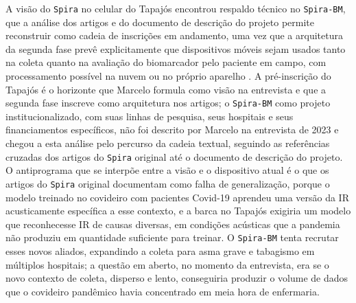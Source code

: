 A visão do \texttt{Spira} no celular do Tapajós encontrou respaldo técnico no \texttt{Spira-BM}, que a análise dos artigos e do documento de descrição do projeto permite reconstruir como cadeia de inscrições em andamento, uma vez que a arquitetura da segunda fase prevê explicitamente que dispositivos móveis sejam usados tanto na coleta quanto na avaliação do biomarcador pelo paciente em campo, com processamento possível na nuvem ou no próprio aparelho \parencite{Finger2025SPIRABM}. A pré-inscrição do Tapajós é o horizonte que Marcelo formula como visão na entrevista e que a segunda fase inscreve como arquitetura nos artigos; o \texttt{Spira-BM} como projeto institucionalizado, com suas linhas de pesquisa, seus hospitais e seus financiamentos específicos, não foi descrito por Marcelo na entrevista de 2023 e chegou a esta análise pelo percurso da cadeia textual, seguindo as referências cruzadas dos artigos do \texttt{Spira} original até o documento de descrição do projeto. O antiprograma que se interpõe entre a visão e o dispositivo atual é o que os artigos do \texttt{Spira} original documentam como falha de generalização, porque o modelo treinado no covideiro com pacientes Covid-19 aprendeu uma versão da IR acusticamente específica a esse contexto, e a barca no Tapajós exigiria um modelo que reconhecesse IR de causas diversas, em condições acústicas que a pandemia não produziu em quantidade suficiente para treinar. O \texttt{Spira-BM} tenta recrutar esses novos aliados, expandindo a coleta para asma grave e tabagismo em múltiplos hospitais; a questão em aberto, no momento da entrevista, era se o novo contexto de coleta, disperso e lento, conseguiria produzir o volume de dados que o covideiro pandêmico havia concentrado em meia hora de enfermaria.

